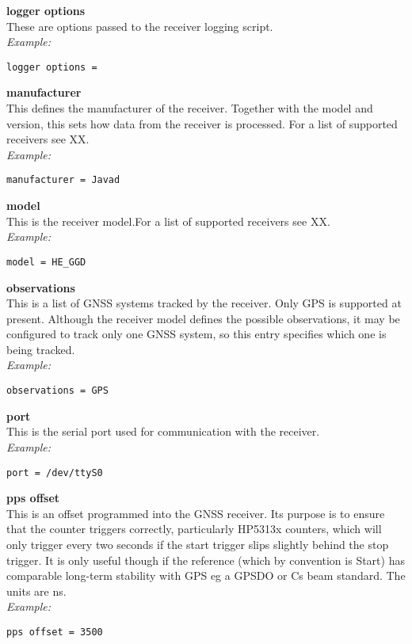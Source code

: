{\bfseries logger options}\\
These are options passed to the receiver logging script.\\
\textit{Example:}
\begin{lstlisting}
logger options =
\end{lstlisting}

{\bfseries manufacturer}\\
This defines the manufacturer of the receiver. Together with the model and version, 
this sets how data from the receiver is processed. For a list of supported receivers
see XX.\\
\textit{Example:}
\begin{lstlisting}
manufacturer = Javad
\end{lstlisting}

{\bfseries model}\\
This is the receiver model.For a list of supported receivers
see XX.\\
\textit{Example:}
\begin{lstlisting}
model = HE_GGD
\end{lstlisting}

{\bfseries observations}\\
This is a list of GNSS systems tracked by the receiver. Only GPS is supported
at present. Although the receiver model defines the possible observations,
it may be configured to track only one GNSS system, so this entry specifies which
one is being tracked.\\
\textit{Example:}
\begin{lstlisting}
observations = GPS
\end{lstlisting}

{\bfseries port}\\
This is the serial port used for communication with the receiver.\\
\textit{Example:}
\begin{lstlisting}
port = /dev/ttyS0
\end{lstlisting}

{\bfseries pps offset}\\
This is an offset programmed into the GNSS receiver. Its purpose is to ensure that the counter
triggers correctly, particularly HP5313x counters, which will only trigger every two seconds if the 
start trigger slips slightly behind the stop trigger. It is only useful though if the reference 
(which by convention is Start) has comparable long-term stability with GPS eg a GPSDO or Cs beam standard.
The units are ns.\\
\textit{Example:}
\begin{lstlisting}
pps offset = 3500
\end{lstlisting}

